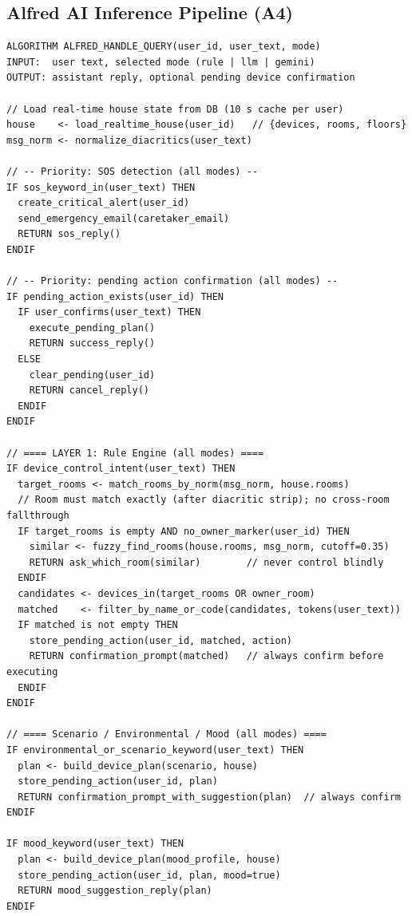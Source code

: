 \subsection{Alfred AI Inference Pipeline (A4)}

\begin{lstlisting}[numbers=none,caption={A4: Alfred AI three-layer inference pipeline},label={lst:pseudo_alfred_flow}]
ALGORITHM ALFRED_HANDLE_QUERY(user_id, user_text, mode)
INPUT:  user text, selected mode (rule | llm | gemini)
OUTPUT: assistant reply, optional pending device confirmation

// Load real-time house state from DB (10 s cache per user)
house    <- load_realtime_house(user_id)   // {devices, rooms, floors}
msg_norm <- normalize_diacritics(user_text)

// -- Priority: SOS detection (all modes) --
IF sos_keyword_in(user_text) THEN
  create_critical_alert(user_id)
  send_emergency_email(caretaker_email)
  RETURN sos_reply()
ENDIF

// -- Priority: pending action confirmation (all modes) --
IF pending_action_exists(user_id) THEN
  IF user_confirms(user_text) THEN
    execute_pending_plan()
    RETURN success_reply()
  ELSE
    clear_pending(user_id)
    RETURN cancel_reply()
  ENDIF
ENDIF

// ==== LAYER 1: Rule Engine (all modes) ====
IF device_control_intent(user_text) THEN
  target_rooms <- match_rooms_by_norm(msg_norm, house.rooms)
  // Room must match exactly (after diacritic strip); no cross-room fallthrough
  IF target_rooms is empty AND no_owner_marker(user_id) THEN
    similar <- fuzzy_find_rooms(house.rooms, msg_norm, cutoff=0.35)
    RETURN ask_which_room(similar)        // never control blindly
  ENDIF
  candidates <- devices_in(target_rooms OR owner_room)
  matched    <- filter_by_name_or_code(candidates, tokens(user_text))
  IF matched is not empty THEN
    store_pending_action(user_id, matched, action)
    RETURN confirmation_prompt(matched)   // always confirm before executing
  ENDIF
ENDIF

// ==== Scenario / Environmental / Mood (all modes) ====
IF environmental_or_scenario_keyword(user_text) THEN
  plan <- build_device_plan(scenario, house)
  store_pending_action(user_id, plan)
  RETURN confirmation_prompt_with_suggestion(plan)  // always confirm
ENDIF

IF mood_keyword(user_text) THEN
  plan <- build_device_plan(mood_profile, house)
  store_pending_action(user_id, plan, mood=true)
  RETURN mood_suggestion_reply(plan)
ENDIF


\end{lstlisting}
